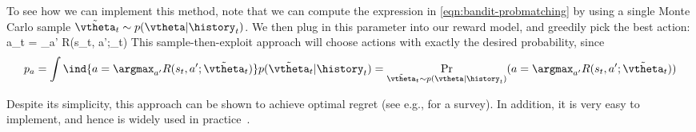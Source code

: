 To see how we can implement this method,
note that 
we can compute the expression
in \cref{eqn:bandit-probmatching} 
by using a single
Monte Carlo sample
$\tilde{\vtheta}_t \sim p(\vtheta|\history_t)$.
We then plug in this parameter
into our reward model, and greedily pick the best action:
\be
a_t = \argmax_{a'} R(s_t, a';\tilde{\vtheta}_t)
\ee
This sample-then-exploit approach
will choose actions with exactly
the desired probability, since
\begin{align}
  p_a
= \int \ind{a=\argmax_{a'} R(s_t,a';\tilde{\vtheta}_t)} p(\tilde{\vtheta}_t|\history_t) 
 = \Pr_{\tilde{\vtheta}_t \sim p(\vtheta|\history_t)}(a=\argmax_{a'} R(s_t, a';\tilde{\vtheta}_t)) 
\end{align}

Despite its simplicity,
this approach can be shown to
achieve optimal  regret (see e.g., \citep{Russo2018} for
a survey).
In addition, it is very easy to implement,
and hence is widely used  in practice~\citep{Graepel10,Scott10,Chapelle11}.

